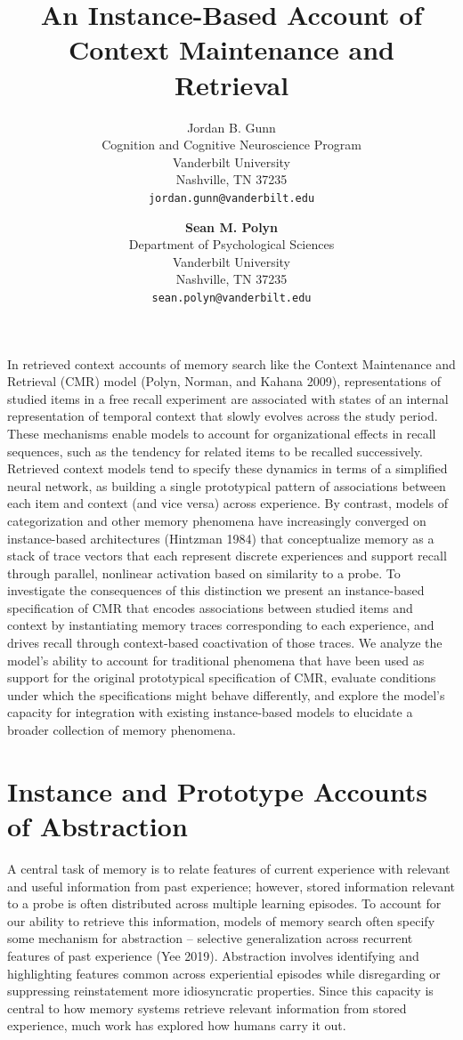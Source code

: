 \documentclass[
  letterpaper,
  DIV=11]{article}
\title{An Instance-Based Account of Context Maintenance and Retrieval}
\author{Jordan B. Gunn\\
Cognition and Cognitive Neuroscience Program\\
Vanderbilt University\\
Nashville, TN 37235\\
\texttt{jordan.gunn@vanderbilt.edu} \and \textbf{Sean M. Polyn}\\
Department of Psychological Sciences\\
Vanderbilt University\\
Nashville, TN 37235\\
\texttt{sean.polyn@vanderbilt.edu}}
\date{}
\begin{document}
\maketitle

In retrieved context accounts of memory search like the Context
Maintenance and Retrieval (CMR) model (Polyn, Norman, and Kahana 2009),
representations of studied items in a free recall experiment are
associated with states of an internal representation of temporal context
that slowly evolves across the study period. These mechanisms enable
models to account for organizational effects in recall sequences, such
as the tendency for related items to be recalled successively. Retrieved
context models tend to specify these dynamics in terms of a simplified
neural network, as building a single prototypical pattern of
associations between each item and context (and vice versa) across
experience. By contrast, models of categorization and other memory
phenomena have increasingly converged on instance-based architectures
(Hintzman 1984) that conceptualize memory as a stack of trace vectors
that each represent discrete experiences and support recall through
parallel, nonlinear activation based on similarity to a probe. To
investigate the consequences of this distinction we present an
instance-based specification of CMR that encodes associations between
studied items and context by instantiating memory traces corresponding
to each experience, and drives recall through context-based coactivation
of those traces. We analyze the model's ability to account for
traditional phenomena that have been used as support for the original
prototypical specification of CMR, evaluate conditions under which the
specifications might behave differently, and explore the model's
capacity for integration with existing instance-based models to
elucidate a broader collection of memory phenomena.

\hypertarget{instance-and-prototype-accounts-of-abstraction}{%
\section{Instance and Prototype Accounts of
Abstraction}\label{instance-and-prototype-accounts-of-abstraction}}

A central task of memory is to relate features of current experience
with relevant and useful information from past experience; however,
stored information relevant to a probe is often distributed across
multiple learning episodes. To account for our ability to retrieve this
information, models of memory search often specify some mechanism for
abstraction -- selective generalization across recurrent features of
past experience (Yee 2019). Abstraction involves identifying and
highlighting features common across experiential episodes while
disregarding or suppressing reinstatement more idiosyncratic properties.
Since this capacity is central to how memory systems retrieve relevant
information from stored experience, much work has explored how humans
carry it out.
\end{document}
